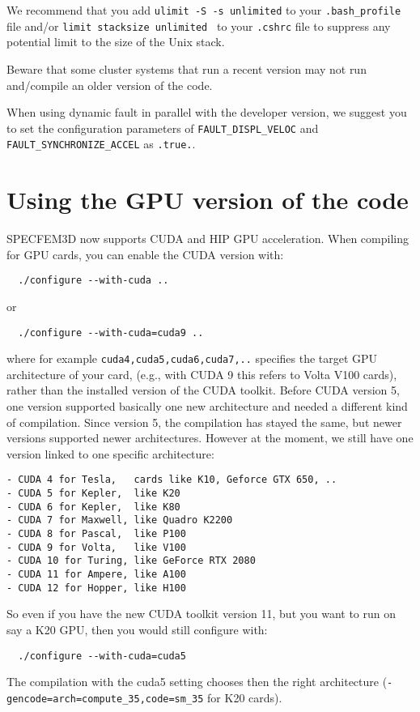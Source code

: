 We recommend that you add {\texttt{ulimit -S -s unlimited}} to your
{\texttt{.bash\_profile}} file and/or {\texttt{limit stacksize
unlimited }} to your {\texttt{.cshrc}} file to suppress any potential
limit to the size of the Unix stack.\newline

Beware that some cluster systems that run a recent version may not run and\slash compile an older version of the code. \newline

When using dynamic fault in parallel with the developer version, we suggest you to set the configuration parameters
of \texttt{FAULT\_DISPL\_VELOC} and \texttt{FAULT\_SYNCHRONIZE\_ACCEL} as \texttt{.true.}.\newline

\section{Using the GPU version of the code}

\noindent
SPECFEM3D now supports CUDA and HIP GPU acceleration.
When compiling for GPU cards, you can enable the CUDA version with:
\begin{verbatim}
  ./configure --with-cuda ..
\end{verbatim}
or
\begin{verbatim}
  ./configure --with-cuda=cuda9 ..
\end{verbatim}
where for example \texttt{cuda4,cuda5,cuda6,cuda7,..} specifies the target GPU architecture of your card,
(e.g., with CUDA 9 this refers to Volta V100 cards), rather than the installed version of the CUDA toolkit.
Before CUDA version 5, one version supported basically one new architecture and needed a different kind of compilation.
Since version 5, the compilation has stayed the same, but newer versions supported newer architectures.
However at the moment, we still have one version linked to one specific architecture:
\begin{verbatim}
- CUDA 4 for Tesla,   cards like K10, Geforce GTX 650, ..
- CUDA 5 for Kepler,  like K20
- CUDA 6 for Kepler,  like K80
- CUDA 7 for Maxwell, like Quadro K2200
- CUDA 8 for Pascal,  like P100
- CUDA 9 for Volta,   like V100
- CUDA 10 for Turing, like GeForce RTX 2080
- CUDA 11 for Ampere, like A100
- CUDA 12 for Hopper, like H100
\end{verbatim}
So even if you have the new CUDA toolkit version 11, but you want to run on say a K20 GPU, then you would still configure with:
\begin{verbatim}
  ./configure --with-cuda=cuda5
\end{verbatim}
The compilation with the cuda5 setting chooses then the right architecture (\texttt{-gencode=arch=compute\_35,code=sm\_35} for K20 cards).\newline



